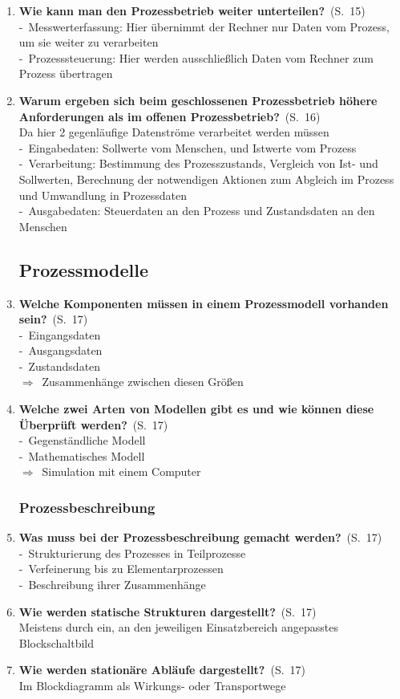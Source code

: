 \documentclass[a4paper,12pt]{article}
\newcommand{\question}[3]{\pagebreak[3]\item {\textbf{#1?}}\ (S.\ #2)#3}
\newcommand{\catchword}[1]{\\-\ #1}
\newcommand{\normaltext}[1]{\\#1}
\newcommand{\result}[1]{\\$\Rightarrow$\ #1}
\newcommand{\page}[1]{#1}
\begin{document}
\begin{enumerate}
  \question{Wie kann man den Prozessbetrieb weiter unterteilen}{\page{15}}
  {
    \catchword{Messwerterfassung: Hier übernimmt der Rechner nur Daten vom Prozess,
               um sie weiter zu verarbeiten}
    \catchword{Prozesssteuerung: Hier werden ausschließlich Daten vom Rechner zum Prozess übertragen}
  }

  \question{Warum ergeben sich beim geschlossenen Prozessbetrieb höhere Anforderungen
            als im offenen Prozessbetrieb}{\page{16}}
  {
    \normaltext{Da hier 2 gegenläufige Datenströme verarbeitet werden müssen}
    \catchword{Eingabedaten: Sollwerte vom Menschen, und Istwerte vom Prozess}
    \catchword{Verarbeitung: Bestimmung des Prozesszustands, Vergleich von Ist- und Sollwerten,
               Berechnung der notwendigen Aktionen zum Abgleich im Prozess und Umwandlung in Prozessdaten}
    \catchword{Ausgabedaten: Steuerdaten an den Prozess und Zustandsdaten an den Menschen}
  }

  \subsection{Prozessmodelle}

  \question{Welche Komponenten müssen in einem Prozessmodell vorhanden sein}{\page{17}}
  {
    \catchword{Eingangsdaten}
    \catchword{Ausgangsdaten}
    \catchword{Zustandsdaten}
    \result{Zusammenhänge zwischen diesen Größen}
  }

  \question{Welche zwei Arten von Modellen gibt es und wie können diese Überprüft werden}{\page{17}}
  {
    \catchword{Gegenständliche Modell}
    \catchword{Mathematisches Modell}
    \result{Simulation mit einem Computer}
  }

  \subsubsection{Prozessbeschreibung}

  \question{Was muss bei der Prozessbeschreibung gemacht werden}{\page{17}}
  {
    \catchword{Strukturierung des Prozesses in Teilprozesse}
    \catchword{Verfeinerung bis zu Elementarprozessen}
    \catchword{Beschreibung ihrer Zusammenhänge}
  }

  \question{Wie werden statische Strukturen dargestellt}{\page{17}}
  {
    \normaltext{Meistens durch ein, an den jeweiligen Einsatzbereich angepasstes Blockschaltbild}
  }

  \question{Wie werden stationäre Abläufe dargestellt}{\page{17}}
  {
    \normaltext{Im Blockdiagramm als Wirkungs- oder Transportwege}
  }


\end{enumerate}
\end{document}
